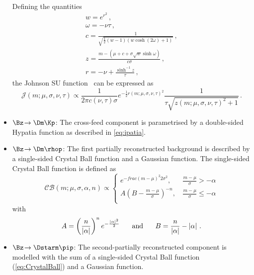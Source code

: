 \begin{itemize}
\begin{equation}
\begin{aligned}
	\end{aligned}
	\end{equation}
	Defining the quantities
	\begin{align*}
	&w=e^{r^2}\,,&\\
	&\omega=-\nu\tau\,,&\\
	&c=\frac{1}{\sqrt{\frac{1}{2}\left(w-1\right)\left(w\cosh\!\left(2\omega\right)+1\right)}}\,,&\\
	&z=\frac{m-\left(\mu+c+\sigma\sqrt{w}\sinh\omega\right)}{c\sigma}\,,&\\
	&r=-\nu+\frac{\sinh^{-1}z}{\tau}\,,&
	\end{align*}
	the Johnson SU function~\cite{JohnsonSU} can be expressed as
	\begin{equation}
	\mathcal{J}\!\left(m;\mu,\sigma,\nu,\tau\right)\propto\frac{1}{2\pi c(\nu,\tau)\sigma}e^{-\frac{1}{2}r(m;\mu,\sigma,\nu,\tau)^2}\frac{1}{\tau\sqrt{z(m;\mu,\sigma,\nu,\tau)^2+1}}\,.\label{eq:johnsonsu}
	\end{equation}
	\item $\Bz\!\to\Dm\Kp$: The cross-feed component is parametrised by a double-sided Hypatia function as described in \cref{eq:ipatia}.
	\item $\Bz\!\to\Dm\rhop$: The first partially reconstructed background is described by a single-sided Crystal Ball function and a Gaussian function.
	The single-sided Crystal Ball function is defined as
	\begin{equation}
	\mathcal{C\!B}\!\left(m;\mu,\sigma,\alpha,n\right)\propto\begin{cases}
	e^{-frac{(m-\mu)^2}{2\sigma^2}}, &\, \frac{m-\mu}{\sigma}>-\alpha\\
	A\left(B-\frac{m-\mu}{\sigma}\right)^{-n}, &\, \frac{m-\mu}{\sigma}\leq-\alpha\\\end{cases}\label{eq:CrystalBall}
	\end{equation}
	with
	\begin{equation}
	A=\left(\frac{n}{\left|\alpha\right|}\right)^{n}e^{-\frac{\left|\alpha\right|^2}{2}}\hspace{0.5cm}\text{ and }\hspace{0.5cm}B=\frac{n}{\left|\alpha\right|}-\left|\alpha\right|\,.
	\end{equation}
	\item $\Bz\!\to\Dstarm\pip$: The second-partially reconstructed component is modelled with the sum of a single-sided Crystal Ball function (\cref{eq:CrystalBall}) and a Gaussian function.
\end{itemize}

